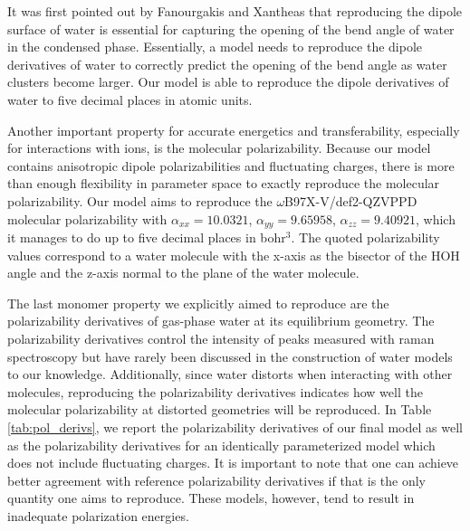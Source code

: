 \documentclass[journal=jacsat,manuscript=article]{achemso}
\begin{document}
It was first pointed out by Fanourgakis and Xantheas that reproducing the dipole surface of water
is essential for capturing the opening of the bend angle of water in the condensed phase.\cite{fanourgakis2006flexible}
Essentially, a model needs to reproduce the dipole derivatives of water to correctly predict
the opening of the bend angle as water clusters become larger. Our model is able to reproduce
the dipole derivatives of water to five decimal places in atomic units.

Another important property for accurate energetics and transferability, especially for interactions with ions,
is the molecular polarizability. Because our model contains anisotropic dipole polarizabilities
and fluctuating charges, there is more than enough flexibility in parameter space to exactly reproduce
the molecular polarizability. Our model aims to reproduce the $\omega$B97X-V/def2-QZVPPD molecular
polarizability with $\alpha_{xx}=10.0321$, $\alpha_{yy}=9.65958$, $\alpha_{zz}=9.40921$, which it manages
to do up to five decimal places in bohr$^3$. The quoted polarizability values correspond to a water
molecule with the x-axis as the bisector of the HOH angle and the z-axis normal to the plane of the
water molecule.

The last monomer property we explicitly aimed to reproduce are the polarizability
derivatives of gas-phase water at its equilibrium geometry. The polarizability derivatives control
the intensity of peaks measured with raman spectroscopy but have rarely been
discussed in the construction of water models to our knowledge. Additionally, since water distorts when interacting
with other molecules, reproducing the polarizability derivatives indicates how well the molecular polarizability
at distorted geometries will be reproduced. In Table \ref{tab:pol_derivs}, we report the polarizability derivatives of our final model
as well as the polarizability derivatives for an identically parameterized model which does not include
fluctuating charges. It is important to note that one can achieve better agreement with reference
polarizability derivatives if that is the only quantity one aims to reproduce. These models, however, tend
to result in inadequate polarization energies.
\end{document}
